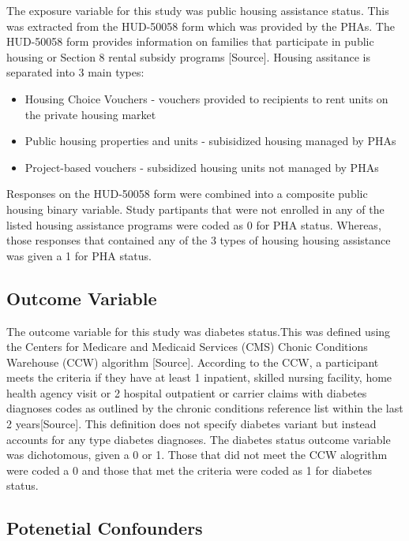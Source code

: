 \documentclass [11pt, proquest] {uwthesis}[2015/03/03]
\providecommand{\tightlist}{%
  \setlength{\itemsep}{0pt}\setlength{\parskip}{0pt}}
\begin{document}
The exposure variable for this study was public housing assistance
status. This was extracted from the HUD-50058 form which was provided by
the PHAs. The HUD-50058 form provides information on families that
participate in public housing or Section 8 rental subsidy programs
{[}Source{]}. Housing assitance is separated into 3 main types:
\begin{itemize}
\tightlist
\item
  Housing Choice Vouchers - vouchers provided to recipients to rent
  units on the private housing market
\item
  Public housing properties and units - subisidized housing managed by
  PHAs
\item
  Project-based vouchers - subsidized housing units not managed by PHAs
\end{itemize}
Responses on the HUD-50058 form were combined into a composite public
housing binary variable. Study partipants that were not enrolled in any
of the listed housing assistance programs were coded as 0 for PHA
status. Whereas, those responses that contained any of the 3 types of
housing housing assistance was given a 1 for PHA status.

\subsection{Outcome Variable}\label{outcome-variable}

The outcome variable for this study was diabetes status.This was defined
using the Centers for Medicare and Medicaid Services (CMS) Chonic
Conditions Warehouse (CCW) algorithm {[}Source{]}. According to the CCW,
a participant meets the criteria if they have at least 1 inpatient,
skilled nursing facility, home health agency visit or 2 hospital
outpatient or carrier claims with diabetes diagnoses codes as outlined
by the chronic conditions reference list within the last 2
years{[}Source{]}. This definition does not specify diabetes variant but
instead accounts for any type diabetes diagnoses. The diabetes status
outcome variable was dichotomous, given a 0 or 1. Those that did not
meet the CCW alogrithm were coded a 0 and those that met the criteria
were coded as 1 for diabetes status.

\subsection{Potenetial Confounders}\label{potenetial-confounders}
\end{document}
